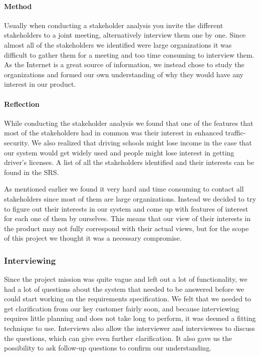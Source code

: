 \documentclass[10pt]{article}
\begin{document}
\paragraph{Method}
\hfill \break
Usually when conducting a stakeholder analysis you invite the different stakeholders to a joint meeting, alternatively interview them one by one. Since almost all of the stakeholders we identified were large organizations it was difficult to gather them for a meeting and too time consuming to interview them. As the Internet is a great source of information, we instead chose to study the organizations and formed our own understanding of why they would have any interest in our product. 

\paragraph{Reflection}
\hfill \break
While conducting the stakeholder analysis we found that one of the features that most of the stakeholders had in common was their interest in enhanced traffic-security. We also realized that driving schools might lose income in the case that our system would get widely used and people might lose interest in getting driver's licenses. A list of all the stakeholders identified and their interests can be found in the SRS\cite{srs}. 

\noindent As mentioned earlier we found it very hard and time consuming to contact all stakeholders since most of them are large organizations. Instead we decided to try to figure out their interests in our system and come up with features of interest for each one of them by ourselves. This means that our view of their interests in the product may not fully correspond with their actual views, but for the scope of this project we thought it was a necessary compromise.

\subsubsection{Interviewing}
Since the project mission was quite vague and left out a lot of functionality, we had a lot of questions about the system that needed to be answered before we could start working on the requirements specification. We felt that we needed to get clarification from our key customer fairly soon, and because interviewing requires little planning and does not take long to perform, it was deemed a fitting technique to use. Interviews also allow the interviewer and interviewees to discuss the questions, which can give even further clarification. It also gave us the possibility to ask follow-up questions to confirm our understanding.
\end{document}
